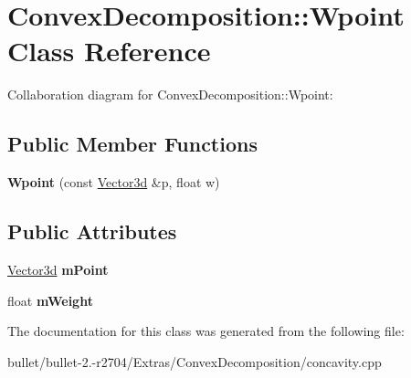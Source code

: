 \hypertarget{class_convex_decomposition_1_1_wpoint}{\section{Convex\+Decomposition\+:\+:Wpoint Class Reference}
\label{class_convex_decomposition_1_1_wpoint}
}


Collaboration diagram for Convex\+Decomposition\+:\+:Wpoint\+:
\subsection*{Public Member Functions}
\begin{DoxyCompactItemize}
\item 
\hypertarget{class_convex_decomposition_1_1_wpoint_aefeb9d4aa39f9b03e10fa5e06d936c75}{{\bfseries Wpoint} (const \hyperlink{class_convex_decomposition_1_1_vector3d}{Vector3d} \&p, float w)}\label{class_convex_decomposition_1_1_wpoint_aefeb9d4aa39f9b03e10fa5e06d936c75}

\end{DoxyCompactItemize}
\subsection*{Public Attributes}
\begin{DoxyCompactItemize}
\item 
\hypertarget{class_convex_decomposition_1_1_wpoint_a6f150ff76383e900f156fedfa3d271fe}{\hyperlink{class_convex_decomposition_1_1_vector3d}{Vector3d} {\bfseries m\+Point}}\label{class_convex_decomposition_1_1_wpoint_a6f150ff76383e900f156fedfa3d271fe}

\item 
\hypertarget{class_convex_decomposition_1_1_wpoint_a28d2c8a31b1932aba5ec4ee766ba298d}{float {\bfseries m\+Weight}}\label{class_convex_decomposition_1_1_wpoint_a28d2c8a31b1932aba5ec4ee766ba298d}

\end{DoxyCompactItemize}


The documentation for this class was generated from the following file\+:\begin{DoxyCompactItemize}
\item 
bullet/bullet-\/2.-\/r2704/\+Extras/\+Convex\+Decomposition/concavity.\+cpp\end{DoxyCompactItemize}

